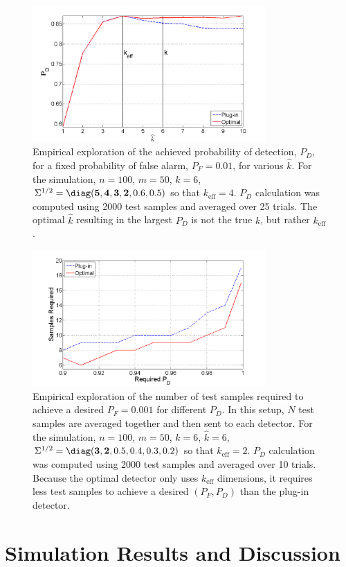 \begin{figure}
\centering
\includegraphics[width=3.5in]{figures/k_hat_graph.png}
\caption{Empirical exploration of the achieved probability of detection, $P_D$, for a fixed probability of false alarm, $P_F=0.01$, for various $\widehat{k}$. For the simulation, $n=100$, $m=50$, $k=6$, $\Sigma^{1/2} = \diag({\bf{5,4,3,2}},0.6,0.5)$ so that $k_{\text{eff}}=4$. $P_D$ calculation was computed using 2000 test samples and averaged over 25 trials. The optimal $\widehat{k}$ resulting in the largest $P_D$ is not the true $k$, but rather $k_\text{eff}$.}
\label{fig:khat}
\end{figure}

\begin{figure}
\centering
\includegraphics[width=3.5in]{figures/samples_graph.png}
\caption{Empirical exploration of the number of test samples required to achieve a desired $P_F=0.001$ for different $P_D$. In this setup, $N$ test samples are averaged together and then sent to each detector. For the simulation, $n=100$, $m=50$, $k=6$, $\widehat{k}=6$,$\Sigma^{1/2} = \diag({\bf{3,2}},0.5,0.4,0.3,0.2)$ so that $k_{\text{eff}}=2$. $P_D$ calculation was computed using 2000 test samples and averaged over 10 trials. Because the optimal detector only uses $k_\text{eff}$ dimensions, it requires less test samples to achieve a desired $(P_F, P_D)$ than the plug-in detector.}
\label{fig:samples}
\end{figure}

\section{Simulation Results and Discussion}\label{sec:disc}

